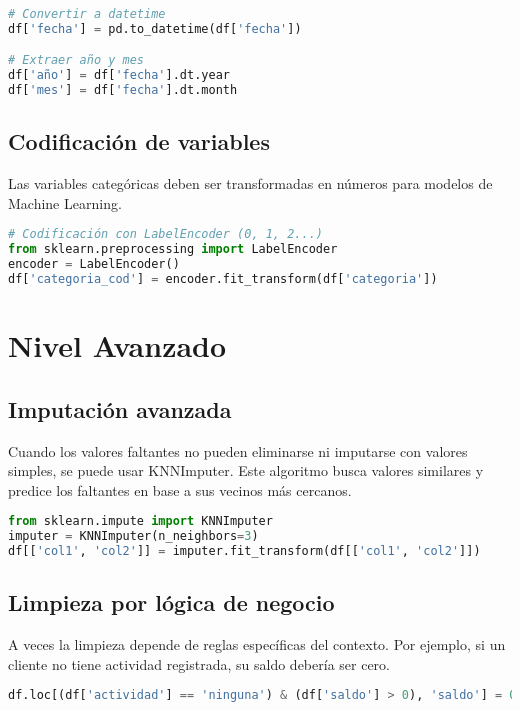 \documentclass[11pt]{article}
\begin{document}
\begin{lstlisting}[language=Python]
# Convertir a datetime
df['fecha'] = pd.to_datetime(df['fecha'])

# Extraer año y mes
df['año'] = df['fecha'].dt.year
df['mes'] = df['fecha'].dt.month
\end{lstlisting}

\subsection*{Codificación de variables}
Las variables categóricas deben ser transformadas en números para modelos de Machine Learning.

\begin{lstlisting}[language=Python]
# Codificación con LabelEncoder (0, 1, 2...)
from sklearn.preprocessing import LabelEncoder
encoder = LabelEncoder()
df['categoria_cod'] = encoder.fit_transform(df['categoria'])
\end{lstlisting}

\section*{Nivel Avanzado}

\subsection*{Imputación avanzada}
Cuando los valores faltantes no pueden eliminarse ni imputarse con valores simples, se puede usar KNNImputer. Este algoritmo busca valores similares y predice los faltantes en base a sus vecinos más cercanos.

\begin{lstlisting}[language=Python]
from sklearn.impute import KNNImputer
imputer = KNNImputer(n_neighbors=3)
df[['col1', 'col2']] = imputer.fit_transform(df[['col1', 'col2']])
\end{lstlisting}

\subsection*{Limpieza por lógica de negocio}
A veces la limpieza depende de reglas específicas del contexto. Por ejemplo, si un cliente no tiene actividad registrada, su saldo debería ser cero.

\begin{lstlisting}[language=Python]
df.loc[(df['actividad'] == 'ninguna') & (df['saldo'] > 0), 'saldo'] = 0
\end{lstlisting}
\end{document}
